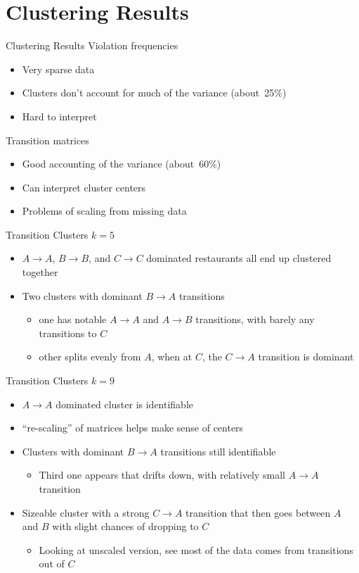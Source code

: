 \documentclass[12pt]{beamer}
\begin{document}
\section{Clustering Results}
\begin{frame}{Clustering Results}
\vfill
Violation frequencies
\begin{itemize}
	\item Very sparse data
	\item Clusters don't account for much of the variance (about~25\%)
	\item Hard to interpret
\end{itemize}
\vfill
Transition matrices
\begin{itemize}
	\item Good accounting of the variance (about~60\%)
	\item Can interpret cluster centers
	\item Problems of scaling from missing data
\end{itemize}
\vfill
\end{frame}

\begin{frame}{Transition Clusters}
\vfill
$k=5$
\begin{itemize}
	\item $A \rightarrow A$, $B \rightarrow B$, and $C \rightarrow C$ dominated
	restaurants all end up clustered together
	\item Two clusters with dominant $B \rightarrow A$ transitions
	\begin{itemize}
		\item one has notable $A \rightarrow A$ and $A \rightarrow B$ transitions,
		with barely any transitions to $C$
		\item other splits evenly from $A$, when at $C$, the $C \rightarrow A$
		transition is dominant
	\end{itemize}
\end{itemize}
\vfill
\end{frame}

\begin{frame}{Transition Clusters}
\vfill
$k=9$
\begin{itemize}
	\item $A \rightarrow A$ dominated cluster is identifiable
	\item ``re-scaling'' of matrices helps make sense of centers
	\item Clusters with dominant $B \rightarrow A$ transitions still identifiable
	\begin{itemize}
		\item Third one appears that drifts down, with relatively small 
		$A \rightarrow A$ transition
	\end{itemize}
	\item Sizeable cluster with a strong $C \rightarrow A$ transition that
	then goes between $A$ and $B$ with slight chances of dropping to $C$
	\begin{itemize}
		\item Looking at unscaled version, see most of the data comes from
		transitions out of $C$
	\end{itemize}
\end{itemize}
\vfill
\end{frame}
\end{document}
